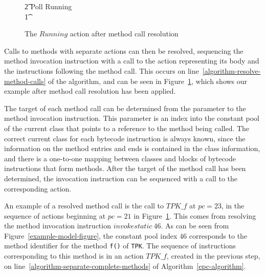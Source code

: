 \begin{figure}[tp!]
{\begin{circus}
    \t2 \circfi \circseq Poll \circseq Running \\
    \t1 \circfi
  \end{circus}
  }
  \caption{The $Running$ action after method call resolution}
  \label{method-call-resolution-example-figure}
\end{figure}

Calls to methods with separate actions can then be resolved,
sequencing the method invocation instruction with a call to the
\Circus{} action representing its body and the instructions following
the method call. 
This occurs on line~\ref{algorithm-resolve-method-calls} of the
algorithm, and can be seen in
Figure~\ref{method-call-resolution-example-figure}, which shows our
example after method call resolution has been applied.

The target of each method call can be determined from the parameter to
the method invocation instruction.
This parameter is an index into the constant pool of the current class
that points to a reference to the method being called.
The correct current class for each bytecode instruction is always
known, since the information on the method entries and ends is
contained in the class information, and there is a one-to-one mapping
between classes and blocks of bytecode instructions that form methods.
After the target of the method call has been determined, the
invocation instruction can be sequenced with a call to the
corresponding \Circus{} action.

An example of a resolved method call is the call to $TPK\_f$ at
$pc = 23$, in the sequence of actions beginning at $pc = 21$ in
Figure~\ref{method-call-resolution-example-figure}. 
This comes from resolving the method invocation instruction
$invokestatic~46$.
As can be seen from Figure~\ref{example-model-figure}, the constant
pool index $46$ corresponds to the method identifier for the method
\texttt{f()} of \texttt{TPK}.
The sequence of instructions corresponding to this method is in an
action $TPK\_f$, created in the previous step, on
line~\ref{algorithm-separate-complete-methods} of
Algorithm~\ref{epc-algorithm}.


